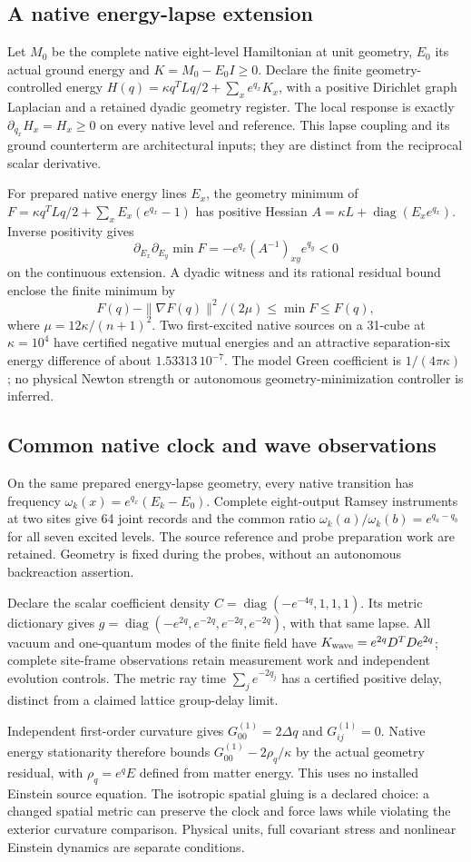 \subsection{A native energy-lapse extension}
Let $M_0$ be the complete native eight-level Hamiltonian at unit geometry,
$E_0$ its actual ground energy and $K=M_0-E_0I\geq0$. Declare the finite
geometry-controlled energy
$H(q)=\kappa q^TLq/2+\sum_x e^{q_x}K_x$, with a positive Dirichlet graph
Laplacian and a retained dyadic geometry register. The local response is
exactly $\partial_{q_x}H_x=H_x\geq0$ on every native level and reference.
This lapse coupling and its ground counterterm are architectural inputs;
they are distinct from the reciprocal scalar derivative.

For prepared native energy lines $E_x$, the geometry minimum of
$F=\kappa q^TLq/2+\sum_x E_x(e^{q_x}-1)$ has positive Hessian
$A=\kappa L+\operatorname{diag}(E_xe^{q_x})$. Inverse positivity gives
\[
 \partial_{E_x}\partial_{E_y}\min F
 =-e^{q_x}(A^{-1})_{xy}e^{q_y}<0
\]
on the continuous extension. A dyadic witness and its rational residual
bound enclose the finite minimum by
\[
 F(q)-\|\nabla F(q)\|^2/(2\mu)\leq\min F\leq F(q),
\]
where $\mu=12\kappa/(n+1)^2$. Two first-excited native sources on a
31-cube at $\kappa=10^4$ have certified negative mutual energies and
an attractive separation-six energy difference of about $1.53313\,10^{-7}$.
The model Green coefficient is $1/(4\pi\kappa)$; no physical Newton
strength or autonomous geometry-minimization controller is inferred.


\subsection{Common native clock and wave observations}
On the same prepared energy-lapse geometry, every native transition has
frequency $\omega_k(x)=e^{q_x}(E_k-E_0)$. Complete eight-output Ramsey
instruments at two sites give 64 joint records and the common ratio
$\omega_k(a)/\omega_k(b)=e^{q_a-q_b}$ for all seven excited levels.
The source reference and probe preparation work are retained. Geometry is
fixed during the probes, without an autonomous backreaction assertion.

Declare the scalar coefficient density
$C=\operatorname{diag}(-e^{-4q},1,1,1)$. Its metric dictionary gives
$g=\operatorname{diag}(-e^{2q},e^{-2q},e^{-2q},e^{-2q})$, with that same
lapse. All vacuum and one-quantum modes of the finite field have
$K_{\rm wave}=e^{2q}D^TD e^{2q}$; complete site-frame observations retain
measurement work and independent evolution controls. The metric ray time
$\sum_j e^{-2q_j}$ has a certified positive delay, distinct from a claimed
lattice group-delay limit.

Independent first-order curvature gives $G_{00}^{(1)}=2\Delta q$ and
$G_{ij}^{(1)}=0$. Native energy stationarity therefore bounds
$G_{00}^{(1)}-2\rho_q/\kappa$ by the actual geometry residual, with
$\rho_q=e^qE$ defined from matter energy. This uses no installed Einstein
source equation. The isotropic spatial gluing is a declared choice:
a changed spatial metric can preserve the clock and force laws while
violating the exterior curvature comparison. Physical units, full
covariant stress and nonlinear Einstein dynamics are separate conditions.
